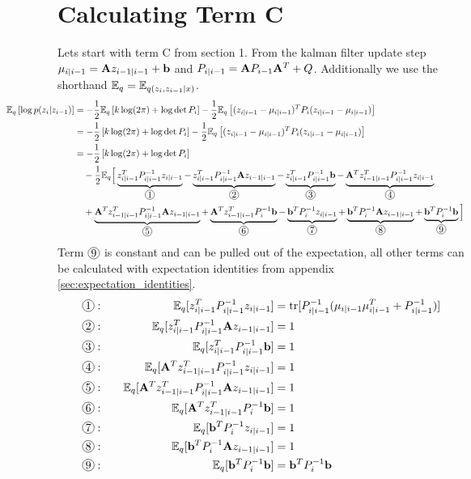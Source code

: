 \documentclass[12pt]{article}
\newcommand*\circled[1]{\tikz[baseline=(char.base)]{
    \node[shape=circle,draw,inner sep=0.8pt] (char) {#1};}}
\begin{document}
\section{Calculating Term C}
Lets start with term C from section 1. From the kalman filter update step $\mu_{i|i-1} = \mathbf{A} z_{i-1|i-1} + \mathbf{b}$ and $P_{i|i-1} = \mathbf{A} P_{i-1} \mathbf{A}^T + Q$. Additionally we use the shorthand $\mathbb{E}_q = \mathbb{E}_{q(z_i, z_{i-1} | x)}$.
\begin{align}
    \hspace*{-2cm} \E_q \left[ \log p(z_i|z_{i-1})\right] &= -\frac{1}{2} \E_q \left[ k \log (2\pi) + \log \det P_i \right] - \frac{1}{2} \E_q \left[ (z_{i|i-1} - \mu_{i|i-1})^T P_i (z_{i|i-1} - \mu_{i|i-1}) \right] \\
    &= -\frac{1}{2} \left[ k \log (2\pi) + \log \det P_i \right] - \frac{1}{2} \E_q \left[ (z_{i|i-1} - \mu_{i|i-1})^T P_i (z_{i|i-1} - \mu_{i|i-1}) \right] \\
    &= -\frac{1}{2} \left[ k \log (2\pi) + \log \det P_i \right] \nonumber \\
    & \quad - \frac{1}{2} \E_q \Big[ \underbrace{z_{i|i-1}^T P_{i|i-1}^{-1} z_{i|i-1}}_{\circled{1}} - \underbrace{z_{i|i-1}^T P_{i|i-1}^{-1}\mA z_{i-1|i-1}}_{\circled{2}} - \underbrace{z_{i|i-1}^T P_{i|i-1}^{-1}\vb}_{\circled{3}} - \underbrace{\mA^Tz_{i-1|i-1}^T P_{i|i-1}^{-1} z_{i|i-1}}_{\circled{4}}  \nonumber \\
    & \quad + \underbrace{\mA^Tz_{i-1|i-1}^T P_{i|i-1}^{-1}\mA z_{i-1|i-1}}_{\circled{5}} + \underbrace{\mA^Tz_{i-1|i-1}^T P_{i}^{-1}\vb}_{\circled{6}} - \underbrace{\vb^T P_{i}^{-1} z_{i|i-1}}_{\circled{7}} + \underbrace{\vb^T P_{i}^{-1} \mA z_{i-1|i-1}}_{\circled{8}} + \underbrace{\vb^T P_{i}^{-1} \vb}_{\circled{9}} \Big]
\end{align}
Term $\circled{9}$ is constant and can be pulled out of the expectation,
all other terms can be calculated with expectation identities from appendix \ref{sec:expectation_identities}.
\begin{alignat*}{3}
    {\circled{1}:} \quad && \E_q[z_{i|i-1}^T P_{i|i-1}^{-1} z_{i|i-1}] &= \tr [P_{i|i-1}^{-1}(\mu_{i|i-1}\mu_{i|i-1}^T+P_{i|i-1}^{-1})] \\
    {\circled{2}:} \quad && \E_q[z_{i|i-1}^T P_{i|i-1}^{-1}\mA z_{i-1|i-1}] &= 1\\
    {\circled{3}:} \quad && \E_q[z_{i|i-1}^T P_{i|i-1}^{-1}\vb] &= 1\\
    {\circled{4}:} \quad && \E_q[\mA^Tz_{i-1|i-1}^T P_{i|i-1}^{-1} z_{i|i-1}] &= 1\\
    {\circled{5}:} \quad && \E_q[\mA^Tz_{i-1|i-1}^T P_{i|i-1}^{-1}\mA z_{i-1|i-1}] &= 1\\
    {\circled{6}:} \quad && \E_q[\mA^Tz_{i-1|i-1}^T P_{i}^{-1}\vb] &= 1\\
    {\circled{7}:} \quad && \E_q[\vb^T P_{i}^{-1} z_{i|i-1}] &= 1\\
    {\circled{8}:} \quad && \E_q[\vb^T P_{i}^{-1} \mA z_{i-1|i-1}] &= 1\\ 
    {\circled{9}:} \quad && \E_q[\vb^T P_{i}^{-1} \vb] &= \vb^T P_{i}^{-1} \vb
\end{alignat*}
\end{document}
